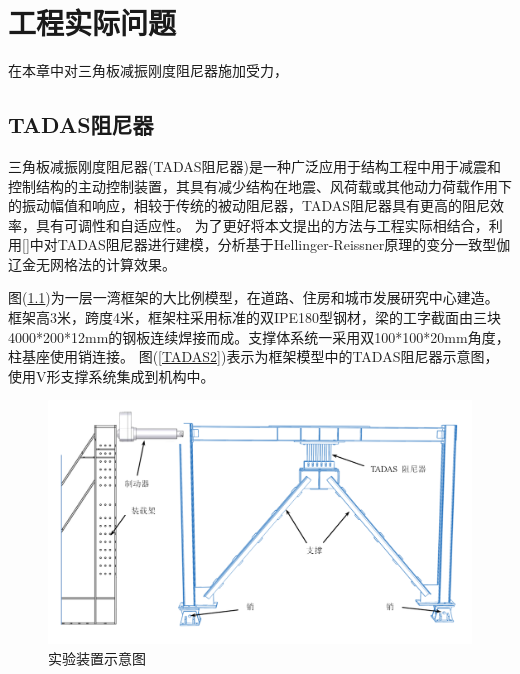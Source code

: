 \chapter{工程实际问题}
在本章中对三角板减振刚度阻尼器施加受力，
\section{TADAS阻尼器}
三角板减振刚度阻尼器(TADAS阻尼器)是一种广泛应用于结构工程中用于减震和控制结构的主动控制装置，其具有减少结构在地震、风荷载或其他动力荷载作用下的振动幅值和响应，相较于传统的被动阻尼器，TADAS阻尼器具有更高的阻尼效率，具有可调性和自适应性。
为了更好将本文提出的方法与工程实际相结合，利用[]中对TADAS阻尼器进行建模，分析基于Hellinger-Reissner原理的变分一致型伽辽金无网格法的计算效果。
\par
图(\ref{TADAS1})为一层一湾框架的大比例模型，在道路、住房和城市发展研究中心建造。框架高3米，跨度4米，框架柱采用标准的双IPE180型钢材，梁的工字截面由三块4000*200*12mm的钢板连续焊接而成。支撑体系统一采用双100*100*20mm角度，柱基座使用销连接。
图(\ref{TADAS2})表示为框架模型中的TADAS阻尼器示意图，使用V形支撑系统集成到机构中。
\begin{figure}[H]
    \centering
    \includegraphics[scale=0.4]{figure/TADAS/1.png}
    \caption{实验装置示意图}\label{TADAS1}
\end{figure}
